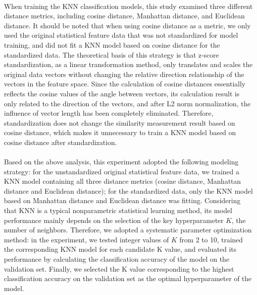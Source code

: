 \\
When training the KNN classification models, this study examined three different distance metrics, including cosine distance, Manhattan distance, and Euclidean distance. It should be noted that when using cosine distance as a metric, we only used the original statistical feature data that was not standardized for model training, and did not fit a KNN model based on cosine distance for the standardized data. The theoretical basis of this strategy is that z-score standardization, as a linear transformation method, only translates and scales the original data vectors without changing the relative direction relationship of the vectors in the feature space. Since the calculation of cosine distances essentially reflects the cosine values of the angle between vectors, its calculation result is only related to the direction of the vectors, and after L2 norm normalization, the influence of vector length has been completely eliminated. Therefore, standardization does not change the similarity measurement result based on cosine distance, which makes it unnecessary to train a KNN model based on cosine distance after standardization.\\
\\
Based on the above analysis, this experiment adopted the following modeling strategy: for the unstandardized original statistical feature data, we trained a KNN model containing all three distance metrics (cosine distance, Manhattan distance and Euclidean distance); for the standardized data, only the KNN model based on Manhattan distance and Euclidean distance was fitting. Considering that KNN is a typical nonparametric statistical learning method, its model performance mainly depends on the selection of the key hyperparameter $K$, the number of neighbors. Therefore, we adopted a systematic parameter optimization method: in the experiment, we tested integer values of $K$ from 2 to 10, trained the corresponding KNN model for each candidate K value, and evaluated its performance by calculating the classification accuracy of the model on the validation set. Finally, we selected the K value corresponding to the highest classification accuracy on the validation set as the optimal hyperparameter of the model.\\
\\
\\
\\
